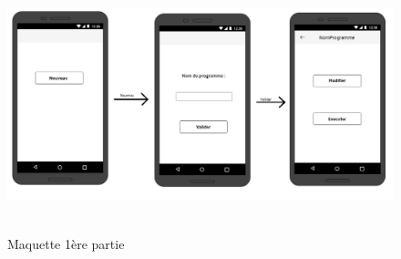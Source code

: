 \documentclass[12pt,francais]{report}
\begin{document}
\begin{figure}[!h]
\begin{addmargin}[-7em]{0em}
\includegraphics[scale=0.45]{./images/maquette1.jpg}~\\[1.5cm]
\caption{Maquette 1ère partie}
\end{addmargin}
\end{figure}
\end{document}
